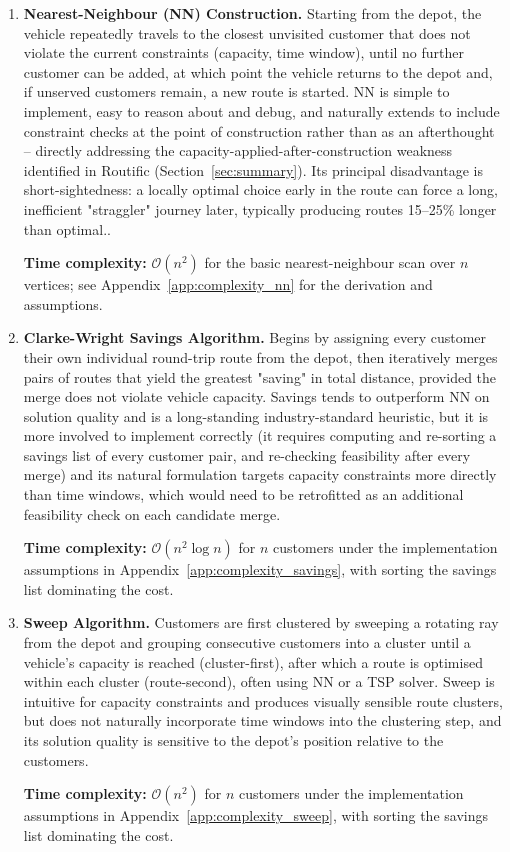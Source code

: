 \documentclass[11pt]{article}
\begin{document}
\begin{enumerate}
    \item \textbf{Nearest-Neighbour (NN) Construction.} Starting from the depot, the vehicle repeatedly travels to the closest unvisited customer that does not violate the current constraints (capacity, time window), until no further customer can be added, at which point the vehicle returns to the depot and, if unserved customers remain, a new route is started. NN is simple to implement, easy to reason about and debug, and naturally extends to include constraint checks at the point of construction rather than as an afterthought -- directly addressing the capacity-applied-after-construction weakness identified in Routific (Section~\ref{sec:summary}). Its principal disadvantage is short-sightedness: a locally optimal choice early in the route can force a long, inefficient "straggler" journey later, typically producing routes 15--25\% longer than optimal.\cite{ref_nn_performance}. 

    \textbf{Time complexity:} $\mathcal{O}(n^2)$ for the basic nearest-neighbour scan over $n$ vertices; see Appendix~\ref{app:complexity_nn} for the derivation and assumptions.

    \item \textbf{Clarke-Wright Savings Algorithm.} Begins by assigning every customer their own individual round-trip route from the depot, then iteratively merges pairs of routes that yield the greatest "saving" in total distance, provided the merge does not violate vehicle capacity. Savings tends to outperform NN on solution quality and is a long-standing industry-standard heuristic, but it is more involved to implement correctly (it requires computing and re-sorting a savings list of every customer pair, and re-checking feasibility after every merge) and its natural formulation targets capacity constraints more directly than time windows, which would need to be retrofitted as an additional feasibility check on each candidate merge.\cite{ref_clarke_wright}

    \textbf{Time complexity:} $\mathcal{O}(n^2\log n)$ for $n$ customers under the implementation assumptions in Appendix~\ref{app:complexity_savings}, with sorting the savings list dominating the cost.

    \item \textbf{Sweep Algorithm.} Customers are first clustered by sweeping a rotating ray from the depot and grouping consecutive customers into a cluster until a vehicle's capacity is reached (cluster-first), after which a route is optimised within each cluster (route-second), often using NN or a TSP solver. Sweep is intuitive for capacity constraints and produces visually sensible route clusters, but does not naturally incorporate time windows into the clustering step, and its solution quality is sensitive to the depot's position relative to the customers.\cite{gillett1974heuristic}

    \textbf{Time complexity:} $\mathcal{O}(n^2)$ for $n$ customers under the implementation assumptions in Appendix~\ref{app:complexity_sweep}, with sorting the savings list dominating the cost.
\end{enumerate}
\end{document}
